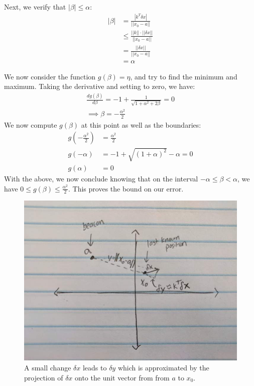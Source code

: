 \documentclass[12pt]{exam}
\begin{document}
\begin{questions}
\begin{solution}
\begin{enumerate}[label=(\alph*)]
    Next, we verify that $|\beta| \leq \alpha$:
    \begin{align*}
      |\beta| &= \frac{|k^T\delta x|}{||x_0 - a||} \\
      &\leq \frac{||k|| \cdot || \delta x ||}{||x_0 - a||} \tag{By the Cauchy-Schwarz inequality} \\
      &= \frac{||\delta x||}{|| x_0 - a||} \tag{$k$ is a unit vector} \\
      &= \alpha
    \end{align*}

    We now consider the function $g(\beta) = \eta$, and try to find the minimum and maximum. Taking the derivative and setting to zero, we have:
    \begin{align*}
      \frac{dg(\beta)}{d\beta} = -1 + \frac{1}{\sqrt{1 + \alpha^2 + 2\beta}}  = 0 \\
      \implies \beta = -\frac{\alpha^2}{2}
    \end{align*}
    We now compute $g(\beta)$ at this point as well as the boundaries:
    \begin{align*}
      g(-\frac{\alpha^2}{2}) &= \frac{\alpha^2}{2} \\
      g(-\alpha) &= -1 + \sqrt{(1 + \alpha)^2} - \alpha = 0\\
      g(\alpha) &= 0
    \end{align*}
    With the above, we now conclude knowing that on the interval $-\alpha \leq \beta < \alpha$, we have $0 \leq g(\beta) \leq \frac{\alpha^2}{2}$. This proves the bound on our error.
  \end{enumerate}
\end{solution}
\begin{figure}[!ht]
  \centering
  \includegraphics[scale=0.6]{figures/single_beacon.jpg}
  \caption{A small change $\delta x$ leads to $\delta y$ which is approximated by the projection of $\delta x$ onto the unit vector from from $a$ to $x_0$.}
  \label{fig:visualizations_single_beacon_r2}
\end{figure}


\end{questions}
\end{document}
